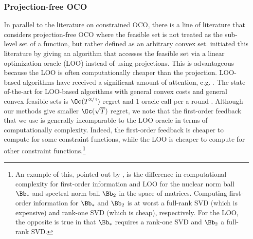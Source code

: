 \subsubsection{Projection-free OCO}

In parallel to the literature on constrained OCO, there is a line of literature that considers projection-free OCO where the feasible set is not treated as the sub-level set of a function, but rather defined as an arbitrary convex set.
\citet{hazan2012projection} initiated this literature by giving an algorithm that accesses the feasible set via a linear optimization oracle (LOO) instead of using projections.
This is advantageous because the LOO is often computationally cheaper than the projection.
LOO-based algorithms have received a significant amount of attention, e.g. \citep{hazan2012projection,chen2019projection,garber2020improved,garber2022new,wang2024non,garberprojection}.
The state-of-the-art for LOO-based algorithms with general convex costs and general convex feasible sets is $\Oc(T^{3/4})$ regret and $1$ oracle call per a round \cite{hazan2012projection}.
Although our methods give smaller $\Oc(\sqrt{T})$ regret, we note that the first-order feedback that we use is generally incomparable to the LOO oracle in terms of computationally complexity.
Indeed, the first-order feedback is cheaper to compute for some constraint functions, while the LOO is cheaper to compute for other constraint functions.\footnote{An example of this, pointed out by \citet{garber2022new}, is the difference in computational complexity for first-order information and LOO for the nuclear norm ball $\Bb_*$ and spectral norm ball $\Bb_2$ in the space of matrices. Computing first-order information for $\Bb_*$ and $\Bb_2$ is at worst a full-rank SVD (which is expensive) and rank-one SVD (which is cheap), respectively. For the LOO, the opposite is true in that $\Bb_*$ requires a rank-one SVD and $\Bb_2$ a full-rank SVD.}

